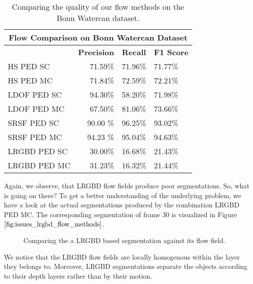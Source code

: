 \begin{table}[H]
\centering
\begin{tabular}{|l|r|l|l|}
\hline
\multicolumn{4}{|c|}{Flow Comparison on Bonn Watercan Dataset} \\ \hline
& \textbf{Precision} & \textbf{Recall} & \textbf{F1 Score} \\ \hline            
HS PED SC  & 71.59\%   & 71.96\%     & 71.77\%  \\ \hline
HS PED MC  & 71.84\%   & 72.59\%     & 72.21\%  \\ \hline                        
LDOF PED SC  & 94.30\%   & 58.20\%     & 71.98\%  \\ \hline
LDOF PED MC  & 67.50\%   & 81.06\%     & 73.66\%  \\ \hline
SRSF PED SC & 90.00 \%   & 96.25\%     & 93.02\%  \\ \hline
SRSF PED MC & 94.23 \%   & 95.04\%     & 94.63\%  \\ \hline
LRGBD PED SC & 30.00\%   & 16.68\%     & 21.43\%  \\ \hline
LRGBD PED MC & 31.23\%   & 16.32\%     & 21.44\%  \\ \hline
\end{tabular}
\caption[Flow Method Comparission on Bonn Watercan]{Comparing the quality of our flow methods on the Bonn Watercan dataset.}
\label{tab:bonn_wc_flwo_methods}
\end{table}
Again, we observe, that LRGBD flow fields produce poor segmentations. So, what is going on there? To get a better understanding of the underlying problem, we have a look at the actual segmentations produced by the combination LRGBD PED MC. The corresponding segmentation of frame 30 is visualized in Figure $\ref{fig:issues_lrgbd_flow_methods}$. 
\begin{figure}[H]
\begin{center}
\end{center}
\caption[Issue with LRGBD Flow Fields]{Comparing the a LRGBD based segmentation against its flow field.}
\label{fig:issues_lrgbd_flow_methods}
\end{figure}
We notice that the LRGBD flow fields are locally homogenous within the layer they belongs to. Moreover, LRGBD segmentations separate the objects according to their depth layers rather than by their motion.

